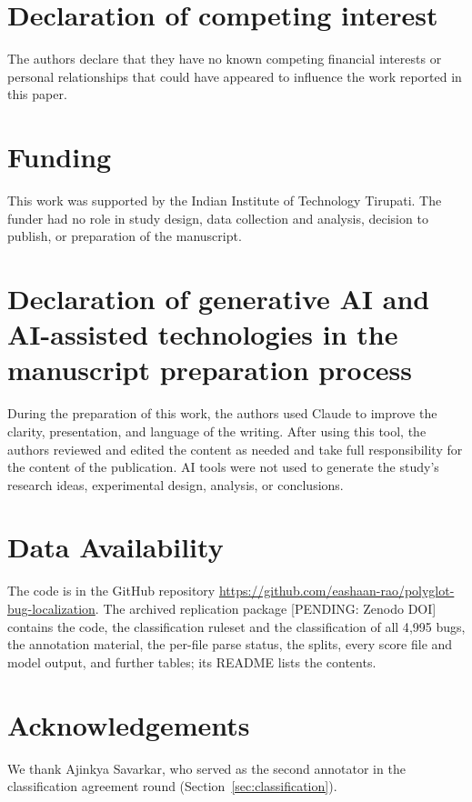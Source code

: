 \documentclass[a4paper,fleqn]{cas-dc}
\newcommand{\pending}[1]{\textcolor{red!70!black}{[PENDING: #1]}}
\begin{document}
\section*{Declaration of competing interest}
The authors declare that they have no known competing financial interests or
personal relationships that could have appeared to influence the work reported in
this paper.

\section*{Funding}
This work was supported by the Indian Institute of Technology Tirupati. The
funder had no role in study design, data collection and analysis, decision to
publish, or preparation of the manuscript.

\section*{Declaration of generative AI and AI-assisted technologies in the manuscript preparation process}
During the preparation of this work, the authors used Claude to improve the clarity, presentation, and language of the
writing. After using this tool, the authors reviewed and edited the content as
needed and take full responsibility for the content of the publication. AI
tools were not used to generate the study's research ideas, experimental
design, analysis, or conclusions.

\section*{Data Availability}
The code is in the GitHub repository
\url{https://github.com/eashaan-rao/polyglot-bug-localization}. The archived
replication package \pending{Zenodo DOI} contains the code, the classification
ruleset and the classification of all 4{,}995 bugs, the annotation material,
the per-file parse status, the splits, every score file and model output, and
further tables; its README lists the contents.

\section*{Acknowledgements}
We thank Ajinkya Savarkar, who served as the second annotator in the
classification agreement round (Section~\ref{sec:classification}).



\end{document}
